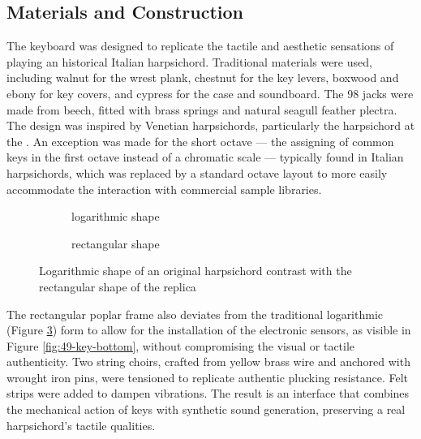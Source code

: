 \subsection{Materials and Construction}
The keyboard was designed to replicate the tactile and aesthetic sensations of playing an historical Italian harpsichord. Traditional materials were used, including walnut for the wrest plank, chestnut for the key levers, boxwood and ebony for key covers, and cypress for the case and soundboard. The 98 jacks were made from beech, fitted with brass springs and natural seagull feather plectra. The design was inspired by Venetian harpsichords, particularly the  harpsichord at the . An exception was made for the short octave --- the assigning of common keys in the first octave instead of a chromatic scale --- typically found in Italian harpsichords, which was replaced by a standard octave layout to more easily accommodate the interaction with commercial sample libraries. 

\begin{figure}[!b]
    \centering
     \begin{subfigure}[h]{0.4\linewidth}
        \centering
                    
        \caption{logarithmic shape}    
        \label{fig:log-harp}
    \end{subfigure}

    
    \begin{subfigure}[h]{0.4\linewidth}
        \centering
                
        \caption{rectangular shape}
        \label{fig:rect-harp}
    \end{subfigure}
    \caption{Logarithmic shape of an original  harpsichord contrast with the rectangular shape of the replica}    
    \Description{}
    \label{fig:log-harp-comp}
\end{figure}

The rectangular poplar frame also deviates from the traditional logarithmic (Figure \ref{fig:log-harp-comp}) form to allow for the installation of the electronic sensors, as visible in Figure \ref{fig:49-key-bottom}, without compromising the visual or tactile authenticity. Two string choirs, crafted from yellow brass wire and anchored with wrought iron pins, were tensioned to replicate authentic plucking resistance. Felt strips were added to dampen vibrations. The result is an interface that combines the mechanical action of keys with synthetic sound generation, preserving a real harpsichord's tactile qualities.


